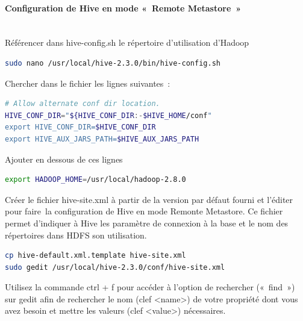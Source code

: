 \documentclass[12pt,english]{book}
\begin{document}
\paragraph{Configuration de Hive en mode « Remote Metastore » }\mbox{}\\

Référencer dans hive-config.sh le répertoire d’utilisation d’Hadoop

\begin{lstlisting}[language=bash, frame=single]
sudo nano /usr/local/hive-2.3.0/bin/hive-config.sh 
\end{lstlisting}

Chercher dans le fichier les lignes suivantes :
\begin{lstlisting}[language=bash, frame=single]
# Allow alternate conf dir location.
HIVE_CONF_DIR="${HIVE_CONF_DIR:-$HIVE_HOME/conf"
export HIVE_CONF_DIR=$HIVE_CONF_DIR
export HIVE_AUX_JARS_PATH=$HIVE_AUX_JARS_PATH
\end{lstlisting}

Ajouter en dessous de ces lignes

\begin{lstlisting}[language=bash, frame=single]
export HADOOP_HOME=/usr/local/hadoop-2.8.0
\end{lstlisting}

Créer le fichier hive-site.xml à partir de la version par défaut fourni et l’éditer pour faire la configuration de Hive en mode Remonte Metastore.
Ce fichier permet d’indiquer à Hive les paramètre de connexion à la base et le nom des répertoires dans HDFS son utilisation.

\begin{lstlisting}[language=bash, frame=single]
cp hive-default.xml.template hive-site.xml
sudo gedit /usr/local/hive-2.3.0/conf/hive-site.xml 
\end{lstlisting}

Utilisez la commande ctrl + f pour accéder à l’option de rechercher (« find ») sur gedit afin de rechercher le nom (clef <name>) de votre propriété dont vous avez besoin et mettre les valeurs (clef <value>) nécessaires. 
\end{document}
